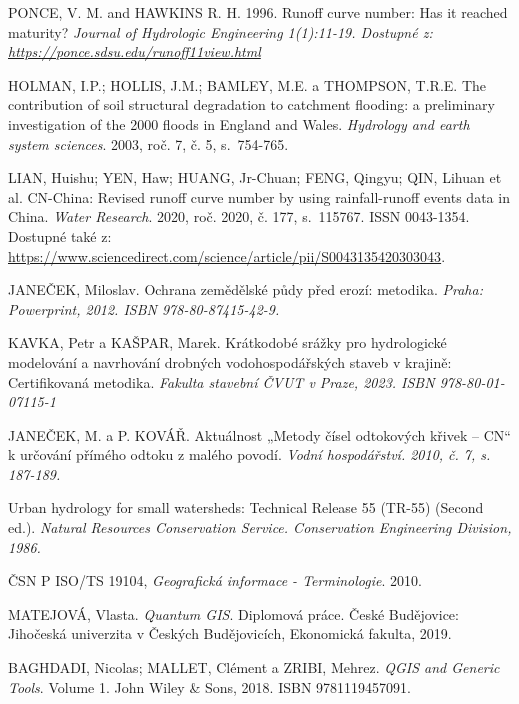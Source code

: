 \documentclass[a4paper,oneside,12pt]{book}
\begin{document}
\begin{thebibliography}{1}
PONCE, V. M. and HAWKINS R. H. 1996. Runoff curve number: Has it reached maturity?
\textit{ Journal of Hydrologic Engineering 1(1):11-19. Dostupné z: \href{https://ponce.sdsu.edu/runoff11view.html}
{https://ponce.sdsu.edu/runoff11view.html}}

HOLMAN, I.P.; HOLLIS, J.M.; BAMLEY, M.E. a THOMPSON, T.R.E. The contribution of soil structural degradation to catchment flooding: a preliminary investigation of the 2000 floods in England and Wales. \textit{Hydrology and earth system sciences}. 2003, roč. 7, č. 5, s.~754-765.

LIAN, Huishu; YEN, Haw; HUANG, Jr-Chuan; FENG, Qingyu; QIN, Lihuan et al. CN-China: Revised runoff curve number by using rainfall-runoff events data in China. \textit{Water Research}. 2020, roč. 2020, č. 177, s.~115767. ISSN 0043-1354. Dostupné také z: \url{https://www.sciencedirect.com/science/article/pii/S0043135420303043}.

JANEČEK, Miloslav. Ochrana zemědělské půdy před erozí: metodika.
\textit{ Praha: Powerprint, 2012. ISBN 978-80-87415-42-9. }

KAVKA, Petr a KAŠPAR, Marek. Krátkodobé srážky pro hydrologické modelování a navrhování drobných vodohospodářských staveb v krajině: Certifikovaná metodika.
\textit{ Fakulta stavební ČVUT v Praze, 2023. ISBN 978-80-01-07115-1}

JANEČEK, M. a P. KOVÁŘ. Aktuálnost „Metody čísel odtokových křivek –
CN“ k určování přímého odtoku z malého povodí.
\textit{ Vodní hospodářství. 2010,
č. 7, s. 187-189.} 

Urban hydrology for small watersheds: Technical Release 55 (TR-55) (Second ed.).
\textit{ Natural Resources Conservation Service. Conservation Engineering Division, 1986.}


ČSN P ISO/TS 19104, \textit{Geografická informace - Terminologie}. 2010.

MATEJOVÁ, Vlasta. \textit{Quantum GIS}. Diplomová práce. České Budějovice: Jihočeská univerzita v Českých Budějovicích, Ekonomická fakulta, 2019.

BAGHDADI, Nicolas; MALLET, Clément a ZRIBI, Mehrez. \textit{QGIS and Generic Tools}. Volume 1. John Wiley \& Sons, 2018. ISBN 9781119457091.


\end{thebibliography}
\end{document}
